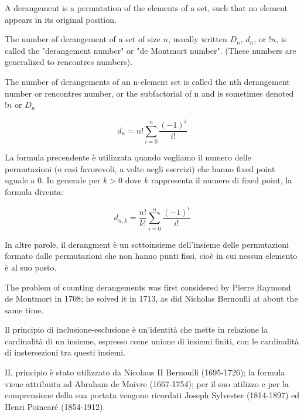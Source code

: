 \begin{definizione}[Derangement]
A derangement is a permutation of the elements of a set, such that no element appears in its original 
position. 
\end{definizione}

\begin{definizione}
The number of derangement of a set of size $n$, usually written $D_{n}$, $d_{n}$, or $!n$, is called the "derangement number" or
"de Montmort number". (These numbers are generalized to rencontres numbers). 

The number of derangements of an n-element set is called the nth derangement number or rencontres number, or the subfactorial
of n and is sometimes denoted $!n$ or $D_{n}$
\end{definizione}

\begin{definizione}
\[
 d_{n} = n!\sum^{n}_{i=0} \frac{(-1)^i}{i!}
\]
\end{definizione}

\begin{definizione}
La formula precendente è utilizzata quando vogliamo il numero delle permutazioni (o casi favorevoli, a volte negli esercizi) che hanno fixed point uguale a 0.
In generale per $k>0$ dove $k$ rappresenta il numero di fixed point, la formula diventa:

\[
 d_{n,k} = \frac{n!}{k!}\sum^{n}_{i=0} \frac{(-1)^i}{i!}
\]

\end{definizione}

In altre parole, il derangment è un sottoinsieme dell'insieme delle permutazioni formato dalle permutazioni che non hanno punti fissi, cioè 
in cui nessun elemento è al suo posto.

The problem of counting derangements was first considered by Pierre Raymond de Montmort in 1708; he solved it in 1713, as did
Nicholas Bernoulli at about the same time. 

\begin{definizione}
Il principio di inclusione-esclusione è un'identità che mette in relazione la cardinalità di un insieme, espresso come unione di insiemi finiti,
con le cardinalità di instersezioni tra questi insiemi.
\end{definizione}

IL principio è stato utilizzato da Nicolaus II Bernoulli (1695-1726); la formula viene attribuita ad Abraham de Moivre (1667-1754);
per il suo utilizzo e per la comprensione della sua portata vengono ricordati Joseph Sylvester (1814-1897) ed Henri Poincaré (1854-1912). 



